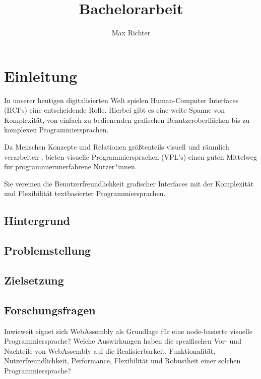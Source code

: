 \documentclass[ngerman]{article}
\title{Bachelorarbeit}
\author{Max Richter}
\begin{document}
\pagestyle{fancy}
\fancyhead{} %
\fancyfoot{} %
\fancyfoot[LE,RO]{\thepage}

\raggedright

\maketitle
\pagebreak

\tableofcontents

\pagebreak

\section{Einleitung}
In unserer heutigen digitalisierten Welt spielen Human-Computer Interfaces (HCI's) eine entscheidende Rolle.
Hierbei gibt es eine weite Spanne von Komplexität, von einfach zu bedienenden grafischen Benutzeroberflächen bis zu komplexen Programmiersprachen. 

Da Menschen Konzepte und Relationen größtenteils visuell und räumlich verarbeiten \cite{smith1975pygmalion}, bieten visuelle Programmiersprachen (VPL's) einen guten Mittelweg für programmierunerfahrene Nutzer*innen. 
 
Sie vereinen die Benutzerfreundlichkeit grafischer Interfaces mit der Komplexität und Flexibilität textbasierter Programmiersprachen. 

\subsection{Hintergrund}
\subsection{Problemstellung}
\subsection{Zielsetzung}
\subsection{Forschungsfragen}

Inwieweit eignet sich WebAssembly als Grundlage für eine node-basierte visuelle Programmiersprache?  
\linebreak
\linebreak
Welche Auswirkungen haben die spezifischen Vor- und Nachteile von WebAssembly auf die Realisierbarkeit, Funktionalität, Nutzerfreundlichkeit, Performance, Flexibilität und Robustheit einer solchen Programmiersprache?
\end{document}
